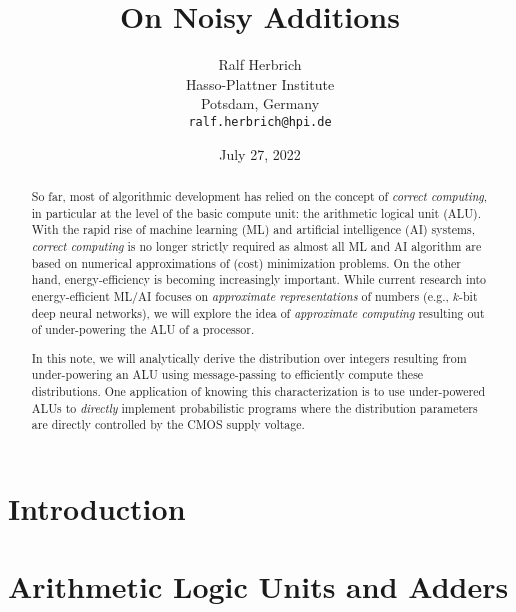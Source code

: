 \documentclass{article}
\title{On Noisy Additions}
\date{July 27, 2022}		%
\author{Ralf Herbrich \\
	Hasso-Plattner Institute\\
	Potsdam, Germany \\
	\texttt{ralf.herbrich@hpi.de} \\
}
\newcommand{\0}{\boldsymbol{0}}
\newcommand{\1}{\boldsymbol{1}}
\begin{document}
\maketitle

\begin{abstract}
	So far, most of algorithmic development has relied on the concept of {\em correct computing}, in particular at the level of the basic compute unit: the arithmetic logical unit (ALU). With the rapid rise of machine learning (ML) and artificial intelligence (AI) systems, {\em correct computing} is no longer strictly required as almost all ML and AI algorithm are based on numerical approximations of (cost) minimization problems. On the other hand, energy-efficiency is becoming increasingly important. While current research into energy-efficient ML/AI focuses on {\em approximate representations} of numbers (e.g., $k$-bit deep neural networks), we will explore the idea of {\em approximate computing} resulting out of under-powering the ALU of a processor. 
	
	In this note, we will analytically derive the distribution over integers resulting from under-powering an ALU using message-passing to efficiently compute these distributions. One application of knowing this characterization is to use under-powered ALUs to {\em directly} implement probabilistic programs where the distribution parameters are directly controlled by the CMOS supply voltage. 
	
\end{abstract}




\section{Introduction}


\section{Arithmetic Logic Units and Adders}

\end{document}
